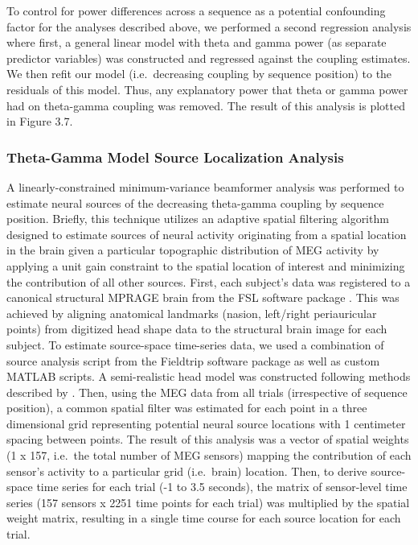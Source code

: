 To control for power differences across a sequence as a potential
confounding factor for the analyses described above, we performed a
second regression analysis where first, a general linear model with
theta and gamma power (as separate predictor variables) was constructed
and regressed against the coupling estimates. We then refit our model
(i.e.~decreasing coupling by sequence position) to the residuals of this
model. Thus, any explanatory power that theta or gamma power had on
theta-gamma coupling was removed. The result of this analysis is plotted
in Figure 3.7.

\subsubsection{Theta-Gamma Model Source Localization
Analysis}\label{theta-gamma-model-source-localization-analysis}

A linearly-constrained minimum-variance beamformer analysis
\autocite{van_veen_localization_1997} was performed to estimate neural
sources of the decreasing theta-gamma coupling by sequence position.
Briefly, this technique utilizes an adaptive spatial filtering algorithm
designed to estimate sources of neural activity originating from a
spatial location in the brain given a particular topographic
distribution of MEG activity by applying a unit gain constraint to the
spatial location of interest and minimizing the contribution of all
other sources. First, each subject's data was registered to a canonical
structural MPRAGE brain from the FSL software package
\autocite{jenkinson_fsl_2012}. This was achieved by aligning anatomical
landmarks (nasion, left/right periauricular points) from digitized head
shape data to the structural brain image for each subject. To estimate
source-space time-series data, we used a combination of source analysis
script from the Fieldtrip software package as well as custom MATLAB
scripts. A semi-realistic head model was constructed following methods
described by \textcite{nolte_magnetic_2003}. Then, using the MEG data
from all trials (irrespective of sequence position), a common spatial
filter was estimated for each point in a three dimensional grid
representing potential neural source locations with 1 centimeter spacing
between points. The result of this analysis was a vector of spatial
weights (1 x 157, i.e.~the total number of MEG sensors) mapping the
contribution of each sensor's activity to a particular grid (i.e.~brain)
location. Then, to derive source-space time series for each trial (-1 to
3.5 seconds), the matrix of sensor-level time series (157 sensors x 2251
time points for each trial) was multiplied by the spatial weight matrix,
resulting in a single time course for each source location for each
trial.

